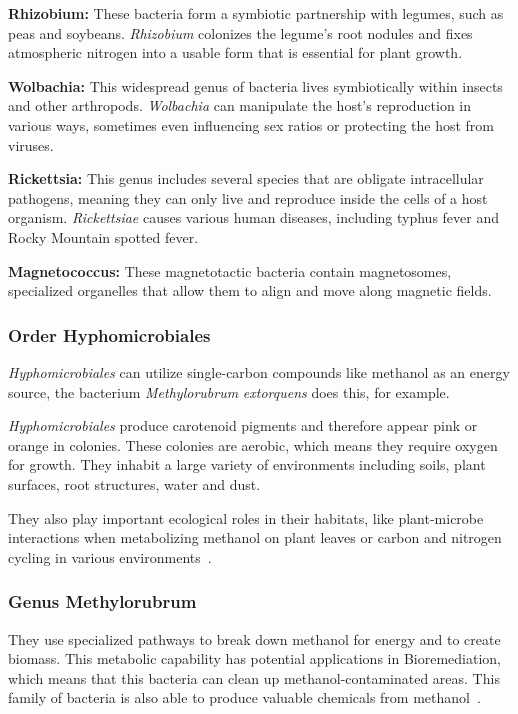\textbf{Rhizobium:} These bacteria form a symbiotic partnership with legumes, such as peas and soybeans.
\emph{Rhizobium} colonizes the legume's root nodules and fixes atmospheric nitrogen into a usable form that is essential for plant growth.

\textbf{Wolbachia:} This widespread genus of bacteria lives symbiotically within insects and other arthropods.
\emph{Wolbachia} can manipulate the host's reproduction in various ways, sometimes even influencing sex ratios or protecting the host from viruses.

\textbf{Rickettsia:} This genus includes several species that are obligate intracellular pathogens, meaning they can only live and reproduce inside the cells of a host organism.
\emph{Rickettsiae} causes various human diseases, including typhus fever and Rocky Mountain spotted fever.

\textbf{Magnetococcus:} These magnetotactic bacteria contain magnetosomes, specialized
organelles that allow them to align and move along magnetic fields.

\subsubsection{Order Hyphomicrobiales}
\emph{Hyphomicrobiales} can utilize single-carbon compounds like methanol as an energy
source, the bacterium \emph{Methylorubrum} \emph{extorquens} does this, for example.

\emph{Hyphomicrobiales} produce carotenoid pigments and therefore appear pink or orange in colonies.
These colonies are aerobic, which means they require oxygen for growth.
They inhabit a large variety of environments including soils, plant surfaces, root structures, water and dust.

They also play important ecological roles in their habitats, like plant-microbe interactions when metabolizing methanol on plant leaves or carbon and nitrogen cycling in various environments~\cite{methylobacteria_groups}.

\subsubsection{Genus Methylorubrum}
They use specialized pathways to break down methanol for energy and to create biomass.
This metabolic capability has potential applications in Bioremediation, which
means that this bacteria can clean up methanol-contaminated areas.
This family of bacteria is also able to produce valuable chemicals from methanol~\cite{new_methylorubrum}.

